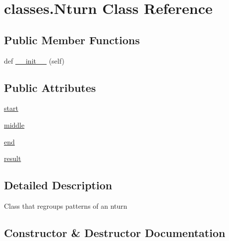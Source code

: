 \hypertarget{classclasses_1_1Nturn}{}\section{classes.\+Nturn Class Reference}
\label{classclasses_1_1Nturn}
\subsection*{Public Member Functions}
\begin{DoxyCompactItemize}
\item 
def \hyperlink{classclasses_1_1Nturn_aaa46588ef9e2e624203269e559a37f7b}{\+\_\+\+\_\+init\+\_\+\+\_\+} (self)
\end{DoxyCompactItemize}
\subsection*{Public Attributes}
\begin{DoxyCompactItemize}
\item 
\hyperlink{classclasses_1_1Nturn_a7b82c733774784bd404e6641ad5de43b}{start}
\item 
\hyperlink{classclasses_1_1Nturn_ab72c3defa393baa4dd19c267af397398}{middle}
\item 
\hyperlink{classclasses_1_1Nturn_aa9545d5d02afa10a3f7f7db821b531b2}{end}
\item 
\hyperlink{classclasses_1_1Nturn_aa0502b069780c201683e342b4e1eda93}{result}
\end{DoxyCompactItemize}


\subsection{Detailed Description}
\begin{DoxyVerb}Class that regroups patterns of an nturn\end{DoxyVerb}
 

\subsection{Constructor \& Destructor Documentation}
\mbox{\label{classclasses_1_1Nturn_aaa46588ef9e2e624203269e559a37f7b}} 
